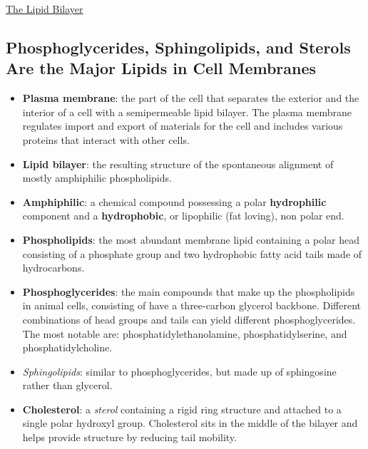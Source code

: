 \documentclass[12pt,letterpaper]{article}
\begin{document}
\hypertarget{10.1}{}
\begin{secbox}{\hyperlink{10}{The Lipid Bilayer}}{
    \subsection*{Phosphoglycerides, Sphingolipids, and Sterols Are the Major
    Lipids in Cell Membranes}
    \begin{itemize}
        \item \textbf{Plasma membrane}: the part of the cell that separates the exterior and the interior of a cell with a semipermeable lipid bilayer. The plasma membrane regulates import and export of materials for the cell and includes various proteins that interact with other cells. 
        \item \textbf{Lipid bilayer}: the resulting structure of the spontaneous alignment of mostly amphiphilic phospholipids. 
        \item \textbf{Amphiphilic}: a chemical compound possessing a polar \textbf{hydrophilic} component and a \textbf{hydrophobic}, or lipophilic (fat loving), non polar end.
        \item \textbf{Phospholipids}: the most abundant membrane lipid containing a polar head consisting of a phosphate group and two hydrophobic fatty acid tails made of hydrocarbons.
        \item \textbf{Phosphoglycerides}: the main compounds that make up the phospholipids in animal cells, consisting of have a three-carbon glycerol backbone. Different combinations of head groups and tails can yield different phosphoglycerides. The most notable are: phosphatidylethanolamine, phosphatidylserine, and phosphatidylcholine.
        \item \textit{Sphingolipids}: similar to phosphoglycerides, but made up of sphingosine rather than glycerol.
        \item \textbf{Cholesterol}: a \textit{sterol} containing a rigid ring structure and attached to a single polar hydroxyl group. Cholesterol sits in the middle of the bilayer and helps provide structure by reducing tail mobility. 
    \end{itemize}

}
\end{secbox}
\end{document}
